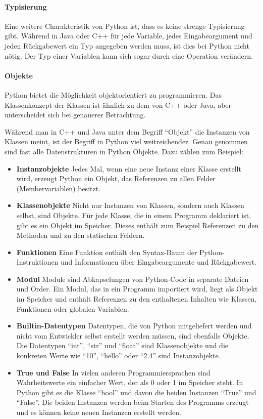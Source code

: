 		\paragraph{Typisierung} Eine weitere Charakteristik von Python ist, dass es keine strenge Typisierung gibt. Während in Java oder C++ für jede Variable, jedes Eingabeargument und jeden Rückgabewert ein Typ angegeben werden muss, ist dies bei Python nicht nötig. Der Typ einer Variablen kann sich sogar durch eine Operation verändern.
		
		\paragraph{Objekte} Python bietet die Möglichkeit objektorientiert zu programmieren. Das Klassenkonzept der Klassen ist ähnlich zu dem von C++ oder Java, aber unterscheidet sich bei genauerer Betrachtung.
		
		Während man in C++ und Java unter dem Begriff "`Objekt"' die Instanzen von Klassen meint, ist der Begriff in Python viel weitreichender. Genau genommen sind fast alle Datenstrukturen in Python Objekte. Dazu zählen zum Beispiel:
		\begin{itemize}
			\item \textbf{Instanzobjekte} Jedes Mal, wenn eine neue Instanz einer Klasse erstellt wird, erzeugt Python ein Objekt, das Referenzen zu allen Felder (Membervariablen) besitzt. 			
			\item \textbf{Klassenobjekte} Nicht nur Instanzen von Klassen, sondern auch Klassen selbst, sind Objekte. Für jede Klasse, die in einem Programm deklariert ist, gibt es ein Objekt im Speicher. Dieses enthält zum Beispiel Referenzen zu den Methoden und zu den statischen Feldern.
			\item \textbf{Funktionen} Eine Funktion enthält den Syntax-Baum der Python-Instruktionen und Informationen über Eingabeargumente und Rückgabewert.
			\item \textbf{Modul} Module sind Abkapselungen von Python-Code in separate Dateien und Order. Ein Modul, das in ein Programm importiert wird, liegt als Objekt im Speicher und enthält Referenzen zu den enthaltenen Inhalten wie Klassen, Funktionen oder globalen Variablen.
			\item \textbf{Builtin-Datentypen} Datentypen, die von Python mitgeliefert werden und nicht vom Entwickler selbst erstellt werden müssen, sind ebenfalls Objekte. Die Datentypen "`int"', "`str"' und "`float"' sind Klassenobjekte und die konkreten Werte wie "`10"', "`hello"' oder "`2.4"' sind Instanzobjekte.
			\item \textbf{True und False} In vielen anderen Programmiersprachen sind Wahrheitswerte ein einfacher Wert, der als 0 oder 1 im Speicher steht. In Python gibt es die Klasse "`bool"' und davon die beiden Instanzen "`True"' und "`False"'. Die beiden Instanzen werden beim Starten des Programms erzeugt und es können keine neuen Instanzen erstellt werden.
		\end{itemize}
		
